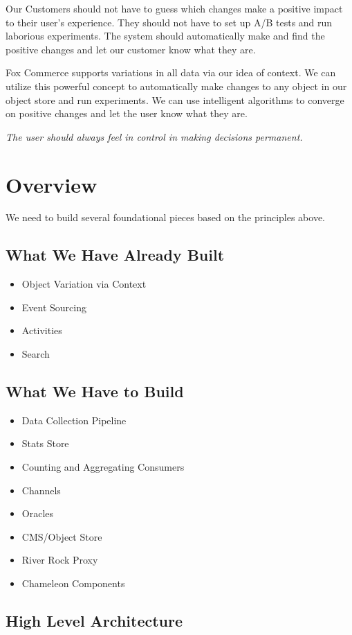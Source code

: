 \documentclass[11pt]{article}
\begin{document}
Our Customers should not have to guess which changes make a positive impact to their
user's experience. They should not have to set up A/B tests and run laborious 
experiments. The system should automatically make and find the positive changes
and let our customer know what they are.

Fox Commerce supports variations in all data via our idea of context. We can
utilize this powerful concept to automatically make changes to any object in our
object store and run experiments. We can use intelligent algorithms to converge on
positive changes and let the user know what they are.

\emph{The user should always feel in control in making decisions permanent.}
\section{Overview}

We need to build several foundational pieces based on the principles above.

\subsection{What We Have Already Built}
\begin{itemize}
    \item Object Variation via Context
    \item Event Sourcing
    \item Activities
    \item Search
\end{itemize}

\subsection{What We Have to Build}
\begin{itemize}
    \item Data Collection Pipeline
    \item Stats Store
    \item Counting and Aggregating Consumers 
    \item Channels
    \item Oracles
    \item CMS/Object Store
    \item River Rock Proxy
    \item Chameleon Components
\end{itemize}

\subsection{High Level Architecture}
\end{document}
